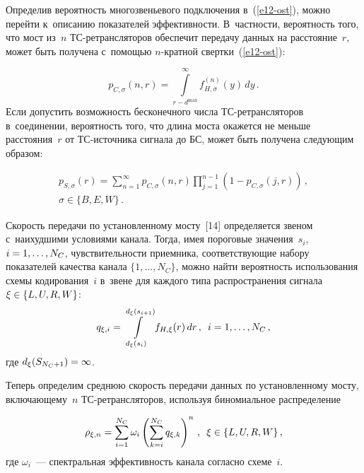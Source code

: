 \begin{multicols}{2}
     Определив вероятность многозвеньевого подключения  
в~(\ref{e12-ost}), можно перейти к~описанию показателей эффективности. 
В~част\-ности, вероятность того, что мост из~$n$ ТС-ре\-транс\-ля\-то\-ров 
обеспечит передачу данных на расстояние~$r$, может быть получена  
с~по\-мощью $n$-крат\-ной свертки~(\ref{e12-ost}):

\noindent
     \begin{equation*}
     p_{C,\sigma}(n,r) =\int\limits^\infty_{r-d^{\max}} f^{(n)}_{H,\sigma} 
(y)\,dy\,.
     \end{equation*}
     Если допустить возможность бесконечного чис\-ла 
 ТС-ре\-транс\-ля\-то\-ров в~соединении, вероятность того, что длина моста 
окажется не меньше расстояния~$r$ от ТС-ис\-точ\-ни\-ка сигнала до БС, 
может быть получена следующим образом:

\noindent
     \begin{multline*}
     p_{S,\sigma} (r)= \sum\limits^\infty_{n=1} p_{C,\sigma} (n,r) 
\prod\limits_{j=1}^{n-1} \left( 1-p_{C,\sigma}(j,r)\right)\,,\\
     \sigma\in \{B,E,W\}\,.
     \end{multline*}
     
     Скорость передачи по установленному мос\-ту~[14] определяется звеном 
с~наихудшими условиями канала. Тогда, имея пороговые значения~$s_i$, 
$i\hm=1,\ldots , N_C$, чувствительности приемника, соответствующие набору 
показателей качества канала $\{1,\ldots , N_C\}$, можно найти вероятность 
использования схемы кодирования~$i$ в~звене для каждого типа 
распространения сигнала $\xi\hm\in \{L,U,R,W\}$:
     \begin{equation*}
     q_{\xi,i} =\int\limits_{d_\xi(s_i)}^{d_\xi(s_{i+1})} f_{H,\xi}(r)\,dr\,,\enskip 
i=1,\ldots , N_C\,,
     \end{equation*}
где $d_\xi(S_{N_C+1})\hm=\infty$.

     Теперь определим среднюю скорость передачи данных по 
установленному мосту, включающему~$n$ ТС-ре\-транс\-ля\-то\-ров, 
используя биномиальное распределение

\noindent
     \begin{equation*}
     \rho_{\xi,n}=\sum\limits_{i=1}^{N_C} \omega_i \left( 
\sum\limits_{k=i}^{N_C} q_{\xi,k}\right)^n\,,\enskip \xi\in \{L,U,R,W\}\,,
     \end{equation*}
где $\omega_i$~--- спектральная эффективность канала согласно схеме~$i$.


\end{multicols}
